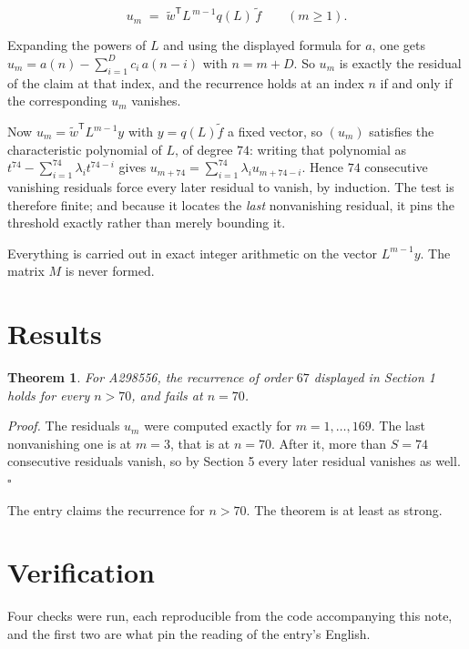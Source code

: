 \documentclass[11pt]{article}
\newtheorem{theorem}{Theorem}
\theoremstyle{definition}
\begin{document}
\[u_m \;=\; \tilde w^{\mathsf T} L^{\,m-1} q(L)\,\tilde f \qquad (m \ge 1).\]

Expanding the powers of $L$ and using the displayed formula for $a$, one gets $u_m = a(n) - \sum_{i=1}^{D} c_i\,a(n-i)$ with $n = m + D$. So $u_m$ is exactly the residual of the claim at that index, and the recurrence holds at an index $n$ if and only if the corresponding $u_m$ vanishes.

Now $u_m = \tilde w^{\mathsf T} L^{m-1} y$ with $y = q(L)\tilde f$ a fixed vector, so $(u_m)$ satisfies the characteristic polynomial of $L$, of degree $74$: writing that polynomial as $t^{74} - \sum_{i=1}^{74} \lambda_i t^{74-i}$ gives $u_{m+74} = \sum_{i=1}^{74} \lambda_i u_{m+74-i}$. Hence $74$ consecutive vanishing residuals force every later residual to vanish, by induction. The test is therefore finite; and because it locates the {\itshape last} nonvanishing residual, it pins the threshold exactly rather than merely bounding it.

Everything is carried out in exact integer arithmetic on the vector $L^{m-1}y$. The matrix $M$ is never formed.

\section{Results}

\begin{theorem} For A298556, the recurrence of order $67$ displayed in Section 1 holds for every $n > 70$, and fails at $n = 70$.\end{theorem}

{\itshape Proof.} The residuals $u_m$ were computed exactly for $m = 1,\dots,169$. The last nonvanishing one is at $m = 3$, that is at $n = 70$. After it, more than $S = 74$ consecutive residuals vanish, so by Section 5 every later residual vanishes as well. $\square$

The entry claims the recurrence for $n > 70$. The theorem is at least as strong.

\section{Verification}

Four checks were run, each reproducible from the code accompanying this note, and the first two are what pin the reading of the entry's English.
\end{document}
